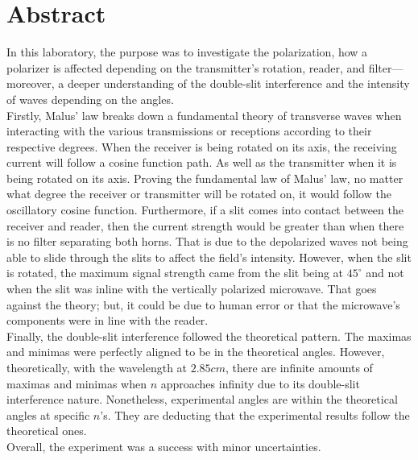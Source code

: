 \documentclass[11pt]{article}
\begin{document}
\section*{Abstract}
In this laboratory, the purpose was to investigate the polarization, how a polarizer is affected depending on the transmitter's rotation, reader, and filter—moreover, a deeper understanding of the double-slit interference and the intensity of waves depending on the angles.\\
Firstly, Malus' law breaks down a fundamental theory of transverse waves when interacting with the various transmissions or receptions according to their respective degrees. When the receiver is being rotated on its axis, the receiving current will follow a cosine function path. As well as the transmitter when it is being rotated on its axis. Proving the fundamental law of Malus' law, no matter what degree the receiver or transmitter will be rotated on, it would follow the oscillatory cosine function. Furthermore, if a slit comes into contact between the receiver and reader, then the current strength would be greater than when there is no filter separating both horns. That is due to the depolarized waves not being able to slide through the slits to affect the field's intensity. However, when the slit is rotated, the maximum signal strength came from the slit being at $45^\circ$ and not when the slit was inline with the vertically polarized microwave. That goes against the theory; but, it could be due to human error or that the microwave's components were in line with the reader.\\
Finally, the double-slit interference followed the theoretical pattern. The maximas and minimas were perfectly aligned to be in the theoretical angles. However, theoretically, with the wavelength at $2.85cm$, there are infinite amounts of maximas and minimas when $n$ approaches infinity due to its double-slit interference nature. Nonetheless, experimental angles are within the theoretical angles at specific $n$'s. They are deducting that the experimental results follow the theoretical ones. \\
Overall, the experiment was a success with minor uncertainties.
\end{document}
